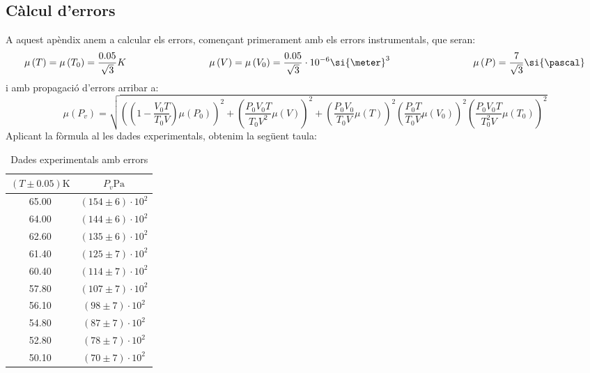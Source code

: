 \documentclass{article}
\begin{document}
    \subsection{Càlcul d'errors}\label{appendix:errors}
        A aquest apèndix anem a calcular els errors, començant primerament amb els errors instrumentals, que seran: \[\mu\left(T\right)=\mu\left(T_0\right)=\frac{0.05}{\sqrt{3}}K \hspace{30mm} \mu\left(V\right)=\mu\left(V_0\right)=\frac{0.05}{\sqrt{3}}\cdot 10^{-6}\si{\meter}^3\hspace{30mm}\mu\left(P\right)=\frac{7}{\sqrt{3}}\si{\pascal}\] i amb propagació d'errors arribar a:\[\mu\left(P_v\right)=\sqrt{\left(\left(1-\frac{V_0T}{T_0V}\right)\mu\left(P_0\right)\right)^2+\left(\frac{P_0V_0T}{T_0V^2}\mu\left(V\right)\right)^2+\left(\frac{P_0V_0}{T_0V}\mu\left(T\right)\right)^2\left(\frac{P_0T}{T_0V}\mu\left(V_0\right)\right)^2\left(\frac{P_0V_0T}{T_0^2V}\mu\left(T_0\right)\right)^2}\]Aplicant la fòrmula al les dades experimentals, obtenim la següent taula:
        \begin{table}[h]\caption{Dades experimentals amb errors}
            \centering
            \begin{tabular}{|cc|}
            \hline
            \rowcolor[HTML]{9698ED} 
            \textbf{$\left(T\pm0.05\right)\si{\kelvin}$} & \textbf{$P_v\si{\pascal}$}       \\ \hline
            \rowcolor[HTML]{FFFFFF} 
            65.00                                        & $\left(154\pm6\right)\cdot 10^2$ \\
            \rowcolor[HTML]{DAE8FC} 
            64.00                                        & $\left(144\pm6\right)\cdot 10^2$ \\
            \rowcolor[HTML]{FFFFFF} 
            62.60                                        & $\left(135\pm6\right)\cdot 10^2$ \\
            \rowcolor[HTML]{DAE8FC} 
            61.40                                        & $\left(125\pm7\right)\cdot 10^2$ \\
            \rowcolor[HTML]{FFFFFF} 
            60.40                                        & $\left(114\pm7\right)\cdot 10^2$ \\
            \rowcolor[HTML]{DAE8FC} 
            57.80                                        & $\left(107\pm7\right)\cdot 10^2$ \\
            56.10                                        & $\left(98\pm7\right)\cdot 10^2$  \\
            \rowcolor[HTML]{DAE8FC} 
            54.80                                        & $\left(87\pm7\right)\cdot 10^2$  \\
            52.80                                        & $\left(78\pm7\right)\cdot 10^2$  \\
            \rowcolor[HTML]{DAE8FC} 
            50.10                                        & $\left(70\pm7\right)\cdot 10^2$  \\ \hline
            \end{tabular}
        \end{table}
        \clearpage
\end{document}
